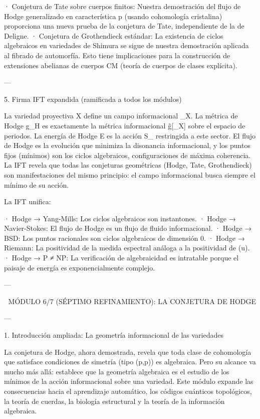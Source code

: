 \documentclass[12pt,twoside]{book}
\begin{document}
· Conjetura de Tate sobre cuerpos finitos: Nuestra demostración del flujo de Hodge generalizado en característica p (usando cohomología cristalina) proporciona una nueva prueba de la conjetura de Tate, independiente de la de Deligne.
· Conjetura de Grothendieck estándar: La existencia de ciclos algebraicos en variedades de Shimura se sigue de nuestra demostración aplicada al fibrado de automorfía. Esto tiene implicaciones para la construcción de extensiones abelianas de cuerpos CM (teoría de cuerpos de clases explícita).

---

5. Firma IFT expandida (ramificada a todos los módulos)

La variedad proyectiva X define un campo informacional \rho_X. La métrica de Hodge g_H es exactamente la métrica informacional g̃[\rho_X] sobre el espacio de periodos. La energía de Hodge E es la acción S_{} restringida a este sector. El flujo de Hodge es la evolución que minimiza la disonancia informacional, y los puntos fijos (mínimos) son los ciclos algebraicos, configuraciones de máxima coherencia. La IFT revela que todas las conjeturas geométricas (Hodge, Tate, Grothendieck) son manifestaciones del mismo principio: el campo informacional busca siempre el mínimo de su acción.

La IFT unifica:

· Hodge → Yang-Mills: Los ciclos algebraicos son instantones.
· Hodge → Navier-Stokes: El flujo de Hodge es un flujo de fluido informacional.
· Hodge → BSD: Los puntos racionales son ciclos algebraicos de dimensión 0.
· Hodge → Riemann: La positividad de la medida espectral análoga a la positividad de \Phi(u).
· Hodge → P ≠ NP: La verificación de algebraicidad es intratable porque el paisaje de energía es exponencialmente complejo.

---


🧬 MÓDULO 6/7 (SÉPTIMO REFINAMIENTO): LA CONJETURA DE HODGE

---

1. Introducción ampliada: La geometría informacional de las variedades

La conjetura de Hodge, ahora demostrada, revela que toda clase de cohomología que satisface condiciones de simetría (tipo (p,p)) es algebraica. Pero su alcance va mucho más allá: establece que la geometría algebraica es el estudio de los mínimos de la acción informacional sobre una variedad. Este módulo expande las consecuencias hacia el aprendizaje automático, los códigos cuánticos topológicos, la teoría de cuerdas, la biología estructural y la teoría de la información algebraica.
\end{document}
